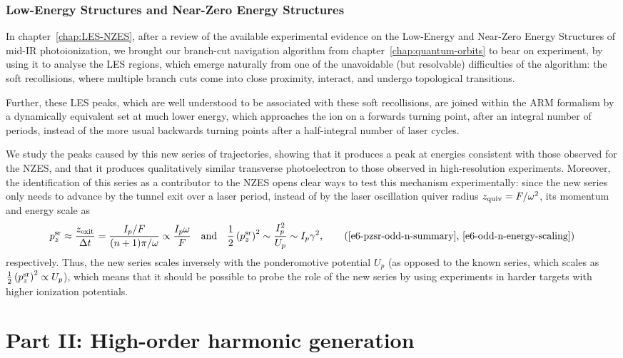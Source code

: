 \subsubsection{Low-Energy Structures and Near-Zero Energy Structures}
In chapter~\ref{chap:LES-NZES}, after a review of the available experimental evidence on the Low-Energy and Near-Zero Energy Structures of mid-IR photoionization, we brought our branch-cut navigation algorithm from chapter~\ref{chap:quantum-orbits} to bear on experiment, by using it to analyse the LES regions, which emerge naturally from one of the unavoidable (but resolvable) difficulties of the algorithm: the soft recollisions, where multiple branch cuts come into close proximity, interact, and undergo topological transitions.

Further, these LES peaks, which are well understood to be associated with these soft recollisions, are joined within the ARM formalism by a dynamically equivalent set at much lower energy, which approaches the ion on a forwards turning point, after an integral number of periods, instead of the more usual backwards turning points after a half-integral number of laser cycles.

We study the peaks caused by this new series of trajectories, showing that it produces a peak at energies consistent with those observed for the NZES, and that it produces qualitatively similar transverse photoelectron to those observed in high-resolution experiments. Moreover, the identification of this series as a contributor to the NZES opens clear ways to test this mechanism experimentally: since the new series only needs to advance by the tunnel exit over a laser period, instead of by the laser oscillation quiver radius $z_\mathrm{quiv}=F/\omega^2$, its momentum and energy scale as
\begin{equation}
\pzsr 
\approx \frac{\zexit}{\Delta t}
= \frac{I_p/F}{(n+1)\pi/\omega}
\propto \frac{I_p\omega}{F}
%
\quad\text{and}\quad
%
\frac12\left(\pzsr\right)^2 
\sim \frac{I_p^2}{U_p}
\sim I_p\gamma^2,
\backtagtwo{e6-pzsr-odd-n-summary}{e6-odd-n-energy-scaling}
\end{equation}
respectively. Thus, the new series scales inversely with the ponderomotive potential $U_p$ (as opposed to the known series, which scales as $\frac12\left(p_z^{\mathrm{sr}}\right)^2 \propto U_p$), which means that it should be possible to probe the role of the new series by using experiments in harder targets with higher ionization potentials.




\section*{Part II: High-order harmonic generation}

